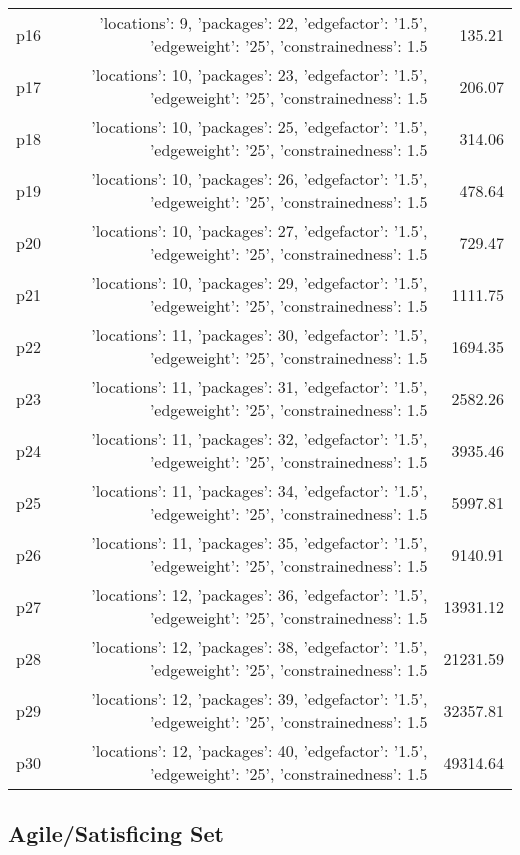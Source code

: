\documentclass{article}
\begin{document}
\begin{center}
\begin{tabular}{@{}l|r|r@{}}
  p16&{'locations': 9, 'packages': 22, 'edgefactor': '1.5', 'edgeweight': '25', 'constrainedness': 1.5}&135.21\\
  p17&{'locations': 10, 'packages': 23, 'edgefactor': '1.5', 'edgeweight': '25', 'constrainedness': 1.5}&206.07\\
  p18&{'locations': 10, 'packages': 25, 'edgefactor': '1.5', 'edgeweight': '25', 'constrainedness': 1.5}&314.06\\
  p19&{'locations': 10, 'packages': 26, 'edgefactor': '1.5', 'edgeweight': '25', 'constrainedness': 1.5}&478.64\\
  p20&{'locations': 10, 'packages': 27, 'edgefactor': '1.5', 'edgeweight': '25', 'constrainedness': 1.5}&729.47\\
  p21&{'locations': 10, 'packages': 29, 'edgefactor': '1.5', 'edgeweight': '25', 'constrainedness': 1.5}&1111.75\\
  p22&{'locations': 11, 'packages': 30, 'edgefactor': '1.5', 'edgeweight': '25', 'constrainedness': 1.5}&1694.35\\
  p23&{'locations': 11, 'packages': 31, 'edgefactor': '1.5', 'edgeweight': '25', 'constrainedness': 1.5}&2582.26\\
  p24&{'locations': 11, 'packages': 32, 'edgefactor': '1.5', 'edgeweight': '25', 'constrainedness': 1.5}&3935.46\\
  p25&{'locations': 11, 'packages': 34, 'edgefactor': '1.5', 'edgeweight': '25', 'constrainedness': 1.5}&5997.81\\
  p26&{'locations': 11, 'packages': 35, 'edgefactor': '1.5', 'edgeweight': '25', 'constrainedness': 1.5}&9140.91\\
  p27&{'locations': 12, 'packages': 36, 'edgefactor': '1.5', 'edgeweight': '25', 'constrainedness': 1.5}&13931.12\\
  p28&{'locations': 12, 'packages': 38, 'edgefactor': '1.5', 'edgeweight': '25', 'constrainedness': 1.5}&21231.59\\
  p29&{'locations': 12, 'packages': 39, 'edgefactor': '1.5', 'edgeweight': '25', 'constrainedness': 1.5}&32357.81\\
  p30&{'locations': 12, 'packages': 40, 'edgefactor': '1.5', 'edgeweight': '25', 'constrainedness': 1.5}&49314.64
                            \end{tabular}
                            \end{center}
                    

                                \subsection*{Agile/Satisficing Set}
                                
\end{document}
